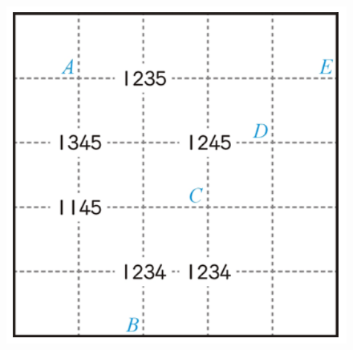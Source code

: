 \documentclass[11pt]{scrartcl}
\begin{document}
\begin{enumerate}
    \begin{figure}[h]
        \centering
        \includegraphics[scale=0.8]{StarGen/0Figure/wmi-2021-6b-sudoku-puzzle.png}
    \end{figure}
\end{enumerate}
\end{document}
